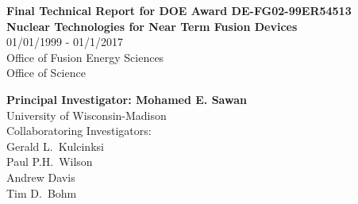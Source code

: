 
\begin{titlepage}
  \begin{center}
    {\Large\bfseries Final Technical Report for DOE Award DE-FG02-99ER54513}\\[1cm]
    {\huge\bfseries Nuclear Technologies for Near Term Fusion Devices}\\[12pt]
    {\Large 01/01/1999 - 01/1/2017}\\

    \vspace{2cm}
    Office of Fusion Energy Sciences\\
    Office of Science
    
    \vspace{2cm}
    {\bfseries Principal Investigator: Mohamed E. Sawan}\\[5pt]
    University of Wisconsin-Madison\\

    \vspace{2cm}
    Collaboratoring Investigators:\\[5pt]
    Gerald L.\ Kulcinksi\\
    Paul P.H.\ Wilson\\
    Andrew Davis\\
    Tim D.\ Bohm
    
    \vfill



    
  \end{center}
\end{titlepage}
